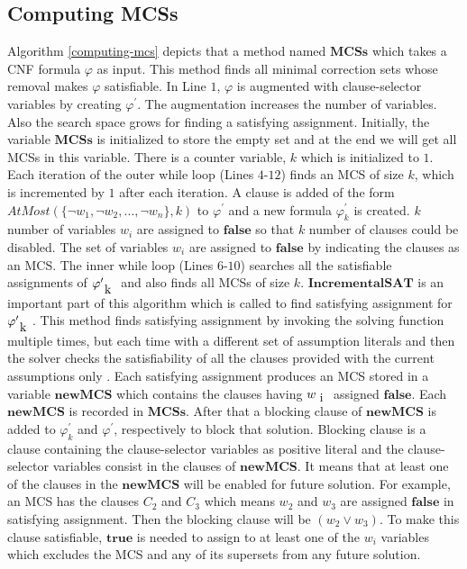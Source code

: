 \subsection{Computing MCSs}
Algorithm \ref{computing-mcs} depicts that a method named $\textbf{MCSs}$ which takes a CNF formula $\varphi$ as input. This method finds all minimal correction sets whose removal makes $\varphi$ satisfiable. In Line $1$, $\varphi$ is augmented with clause-selector variables by creating $\varphi^{\prime}$. The augmentation increases the number of variables. Also the search space grows for finding a satisfying assignment. Initially, the variable $\mathbf{MCSs}$ is initialized to store the empty set and  at the end we will get all MCSs in this variable. There is a counter variable, $k$ which is initialized to $1$.\newline
Each iteration of the outer while loop (Lines $4$-$12$) finds an MCS of size $k$, which is incremented by $1$ after each iteration. A clause is added of the form $AtMost(\{\neg w_{1},\neg w_{2},\ldots,\neg w_{n}\},k)$ to $\varphi^{\prime}$ and a new formula $\varphi^{\prime}_{k}$ is created. $k$ number of variables $w_{i}$ are assigned to $\mathbf{false}$ so that $k$ number of clauses could be disabled. The set of variables $w_{i}$ are assigned to $\mathbf{false}$ by indicating the clauses as an MCS.\newline
The inner while loop (Lines $6$-$10$) searches all the satisfiable assignments of $\varphi^{\prime}_{\text k}$ and also finds all MCSs of size $k$. $\mathbf{IncrementalSAT}$ is an important part of this algorithm which is called to find satisfying assignment for $\varphi^{\prime}_{\text k}$. This method finds satisfying assignment by invoking the solving function multiple times, but each time with a different set of assumption literals and then the solver checks the satisfiability of all the clauses provided with the current assumptions only \cite{nadel}. Each satisfying assignment produces an MCS stored in a variable $\mathbf{newMCS}$ which contains the clauses having $w_{\text i}$ assigned $\mathbf{false}$. Each $\mathbf{newMCS}$ is recorded in $\mathbf{MCSs}$. After that a blocking clause of $\mathbf{newMCS}$ is added to $\varphi^{\prime}_{k}$ and $\varphi^{\prime}$, respectively to block that solution. Blocking clause is a clause containing the clause-selector variables as positive literal and the clause-selector variables consist in the clauses of $\mathbf{newMCS}$. It means that at least one of the clauses in the $\mathbf{newMCS}$ will be enabled for future solution. For example, an MCS has the clauses $C_{2}$ and $C_{3}$ which means $w_{2}$ and $w_{3}$ are assigned $\mathbf{false}$ in satisfying assignment. Then the blocking clause will be $(w_{2}\vee w_{3})$. To make this clause satisfiable, $\mathbf{true}$ is needed to assign to at least one of the $w_{i}$ variables which excludes the MCS and any of its supersets from any future solution.\newline
